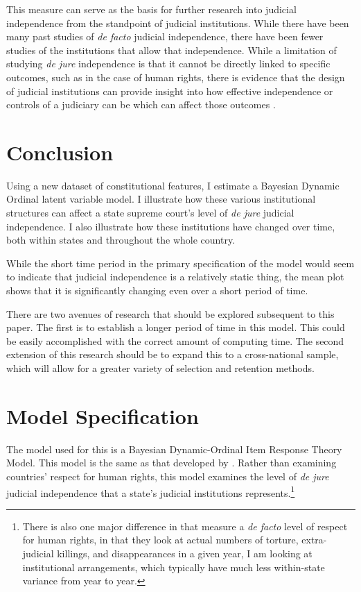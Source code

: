 \documentclass[12pt]{article}
\begin{document}
This measure can serve as the basis for further research into judicial independence from the standpoint of judicial institutions.  While there have been many past studies of \textit{de facto} judicial independence, there have been fewer studies of the institutions that allow that independence.  While a limitation of studying \textit{de jure} independence is that it cannot be directly linked to specific outcomes, such as in the case of human rights, there is evidence that the design of judicial institutions can provide insight into how effective independence or controls of a judiciary can be which can affect those outcomes \citep{Keith2002a,Keith2002b}.  

\section{Conclusion}
Using a new dataset of constitutional features, I estimate a Bayesian Dynamic Ordinal latent variable model.  I illustrate how these various institutional structures can affect a state supreme court's level of \textit{de jure} judicial independence.  I also illustrate how these institutions have changed over time, both within states and throughout the whole country.  

While the short time period in the primary specification of the model would seem to indicate that judicial independence is a relatively static thing, the mean plot shows that it is significantly changing even over a short period of time. 

There are two avenues of research that should be explored subsequent to this paper.  The first is to establish a longer period of time in this model.  This could be easily accomplished with the correct amount of computing time.  The second extension of this research should be to expand this to a cross-national sample, which will allow for a greater variety of selection and retention methods.

\newpage
\singlespacing



\appendix
\section{Model Specification}\label{ModelApp}
The model used for this is a Bayesian Dynamic-Ordinal Item Response Theory Model.  This model is the same as that developed by \citet{Schnakenberg2014}.  Rather than examining countries' respect for human rights, this model examines the level of \textit{de jure} judicial independence that a state's judicial institutions represents.\footnote{There is also one major difference in that \citeauthor{Schnakenberg2014} measure a \textit{de facto} level of respect for human rights, in that they look at actual numbers of torture, extra-judicial killings, and disappearances in a given year, I am looking at institutional arrangements, which typically have much less within-state variance from year to year.}	
\end{document}
